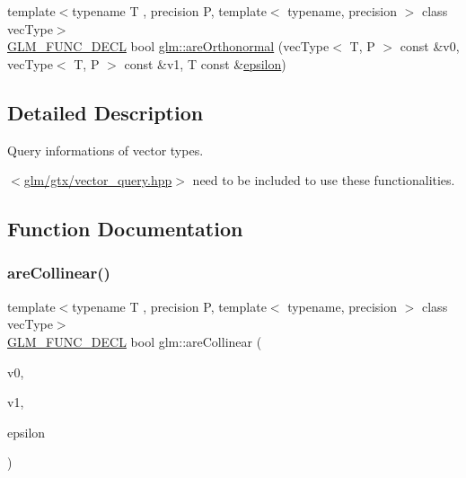 \begin{DoxyCompactItemize}
\item 
{\footnotesize template$<$typename T , precision P, template$<$ typename, precision $>$ class vec\+Type$>$ }\\\hyperlink{setup_8hpp_ab2d052de21a70539923e9bcbf6e83a51}{G\+L\+M\+\_\+\+F\+U\+N\+C\+\_\+\+D\+E\+CL} bool \hyperlink{group__gtx__vector__query_ga89c82bc60e5b84e4489b74c15a134caf}{glm\+::are\+Orthonormal} (vec\+Type$<$ T, P $>$ const \&v0, vec\+Type$<$ T, P $>$ const \&v1, T const \&\hyperlink{group__gtc__constants_gacb41049b8d22c8aa90e362b96c524feb}{epsilon})
\end{DoxyCompactItemize}


\subsection{Detailed Description}
Query informations of vector types. 

$<$\hyperlink{vector__query_8hpp}{glm/gtx/vector\+\_\+query.\+hpp}$>$ need to be included to use these functionalities. 

\subsection{Function Documentation}
\mbox{\label{group__gtx__vector__query_ga465b844190d1740051e45d780832ea4c}} 
\subsubsection{\texorpdfstring{are\+Collinear()}{areCollinear()}}
{\footnotesize\ttfamily template$<$typename T , precision P, template$<$ typename, precision $>$ class vec\+Type$>$ \\
\hyperlink{setup_8hpp_ab2d052de21a70539923e9bcbf6e83a51}{G\+L\+M\+\_\+\+F\+U\+N\+C\+\_\+\+D\+E\+CL} bool glm\+::are\+Collinear (\begin{DoxyParamCaption}\item[{vec\+Type$<$ T, P $>$ const \&}]{v0,  }\item[{vec\+Type$<$ T, P $>$ const \&}]{v1,  }\item[{T const \&}]{epsilon }\end{DoxyParamCaption})}

